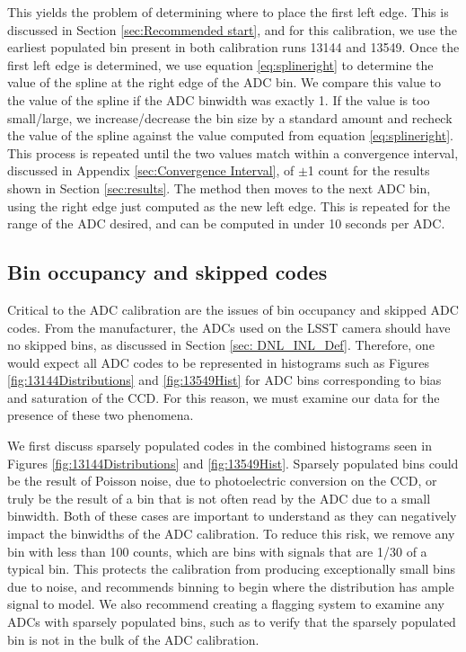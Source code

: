 \documentclass[linenumbers]{aastex7}
\begin{document}
This yields the problem of determining where to place the first left edge. 
This is discussed in Section \ref{sec:Recommended start}, and for this calibration, we use the earliest populated bin present in both calibration runs 13144 and 13549. 
Once the first left edge is determined, we use equation \ref{eq:splineright} to determine the value of the spline at the right edge of the ADC bin. 
We compare this value to the value of the spline if the ADC binwidth was exactly 1. 
If the value is too small/large, we increase/decrease the bin size by a standard amount and recheck the value of the spline against the value computed from equation \ref{eq:splineright}. 
This process is repeated until the two values match within a convergence interval, discussed in Appendix \ref{sec:Convergence Interval}, of $\pm$1 count for the results shown in Section \ref{sec:results}.
The method then moves to the next ADC bin, using the right edge just computed as the new left edge. 
This is repeated for the range of the ADC desired, and can be computed in under 10 seconds per ADC. 

\subsection{Bin occupancy and skipped codes} 
\label{sec: SkippedBins}

Critical to the ADC calibration are the issues of bin occupancy and skipped ADC codes. 
From the manufacturer, the ADCs used on the LSST camera should have no skipped bins, as discussed in Section \ref{sec: DNL_INL_Def}.
Therefore, one would expect all ADC codes to be represented in histograms such as Figures \ref{fig:13144Distributions} and \ref{fig:13549Hist} for ADC bins corresponding to bias and saturation of the CCD. 
For this reason, we must examine our data for the presence of these two phenomena. 

We first discuss sparsely populated codes in the combined histograms seen in Figures \ref{fig:13144Distributions} and \ref{fig:13549Hist}. 
Sparsely populated bins could be the result of Poisson noise, due to photoelectric conversion on the CCD, or truly be the result of a bin that is not often read by the ADC due to a small binwidth.  
Both of these cases are important to understand as they can negatively impact the binwidths of the ADC calibration. 
To reduce this risk, we remove any bin with less than 100 counts, which are bins with signals that are 1/30 of a typical bin.
This protects the calibration from producing exceptionally small bins due to noise, and recommends binning to begin where the distribution has ample signal to model. 
We also recommend creating a flagging system to examine any ADCs with sparsely populated bins, such as to verify that the sparsely populated bin is not in the bulk of the ADC calibration. 
\end{document}
